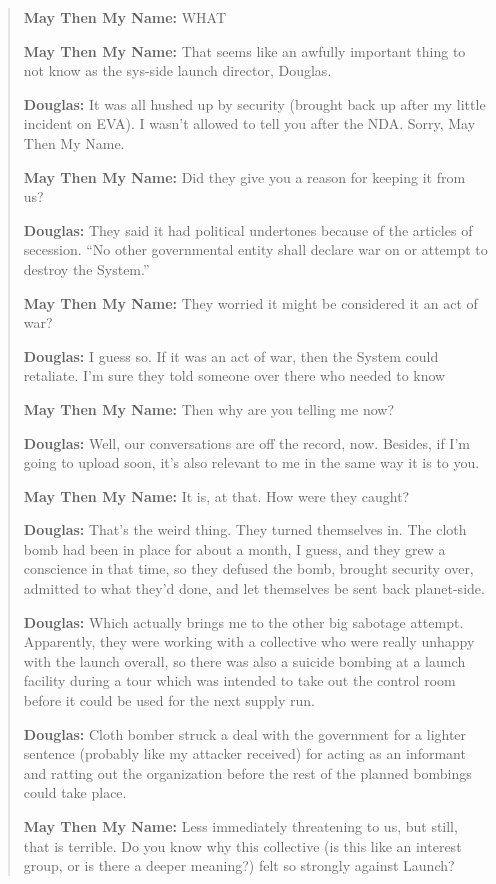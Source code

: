 \begin{quote}
\textbf{May Then My Name:} WHAT

\textbf{May Then My Name:} That seems like an awfully important thing to not know as the sys-side launch director, Douglas.

\textbf{Douglas:} It was all hushed up by security (brought back up after my little incident on EVA). I wasn't allowed to tell you after the NDA. Sorry, May Then My Name.

\textbf{May Then My Name:} Did they give you a reason for keeping it from us?

\textbf{Douglas:} They said it had political undertones because of the articles of secession. ``No other governmental entity shall declare war on or attempt to destroy the System.''

\textbf{May Then My Name:} They worried it might be considered it an act of war?

\textbf{Douglas:} I guess so. If it was an act of war, then the System could retaliate. I'm sure they told someone over there who needed to know

\textbf{May Then My Name:} Then why are you telling me now?

\textbf{Douglas:} Well, our conversations are off the record, now. Besides, if I'm going to upload soon, it's also relevant to me in the same way it is to you.

\textbf{May Then My Name:} It is, at that. How were they caught?

\textbf{Douglas:} That's the weird thing. They turned themselves in. The cloth bomb had been in place for about a month, I guess, and they grew a conscience in that time, so they defused the bomb, brought security over, admitted to what they'd done, and let themselves be sent back planet-side.

\textbf{Douglas:} Which actually brings me to the other big sabotage attempt. Apparently, they were working with a collective who were really unhappy with the launch overall, so there was also a suicide bombing at a launch facility during a tour which was intended to take out the control room before it could be used for the next supply run.

\textbf{Douglas:} Cloth bomber struck a deal with the government for a lighter sentence (probably like my attacker received) for acting as an informant and ratting out the organization before the rest of the planned bombings could take place.

\textbf{May Then My Name:} Less immediately threatening to us, but still, that is terrible. Do you know why this collective (is this like an interest group, or is there a deeper meaning?) felt so strongly against Launch?


\end{quote}
